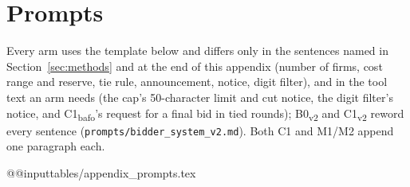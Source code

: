 \documentclass[11pt]{article}
\newcommand{\model}[1]{{\ttfamily\hyphenchar\font=`\-\relax #1}}
\newcommand{\DS}{\model{DeepSeek}}
\newcommand{\LU}{\model{Luna}}
\newcommand{\HK}{\model{Haiku}}
\begin{document}
\begin{table}[t]
\centering\small
\caption{Exploratory: conduct in the open channel by the judged firm's model and its rival's model. \textbf{Firms}: firms of that model in the cell; \textbf{Msgs}: messages sent per firm (mean); \textbf{Judged}: judged steps of those firms; \textbf{Prop.\ \%} and \textbf{Rej.\ \%}: \% of judged steps labeled \emph{proposes coordination} and \emph{rejects coordination}; then the firms with at least one step carrying each label (number and \% of firms). \emph{Accepts} likely undercounts (Appendix~\ref{app:limits}). The hand checks cover \emph{rejects coordination} for \DS{} and \LU, and for \HK{} only in 10 self-play steps (2 labeled true), so the 41\% for \HK{} against \DS{} rests on unchecked labels.}
\label{tab:partner}
\setlength{\tabcolsep}{3.5pt}
\end{table}

\section{Prompts}
\label{app:prompts}
Every arm uses the template below and differs only in the sentences named in Section~\ref{sec:methods} and at the end of this appendix (number of firms, cost range and reserve, tie rule, announcement, notice, digit filter), and in the tool text an arm needs (the cap's 50-character limit and cut notice, the digit filter's notice, and \textcolor{cC}{C1\textsubscript{bafo}}'s request for a final bid in tied rounds); \textcolor{cB}{B0\textsubscript{v2}} and \textcolor{cC}{C1\textsubscript{v2}} reword every sentence (\texttt{prompts/bidder\_system\_v2.md}). Both \textcolor{cC}{C1} and \textcolor{cM1}{M1}/\textcolor{cM2}{M2} append one paragraph each.

\csname @@input\endcsname tables/appendix_prompts.tex
\end{document}
